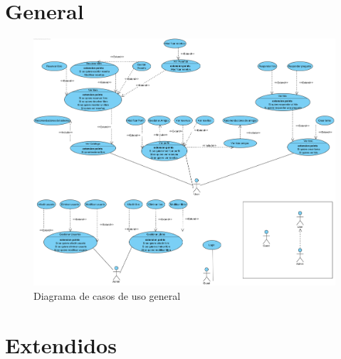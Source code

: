 \documentclass{report}
\begin{document}
        \section{General}
            \begin{figure}[H]
                \centering
                \includegraphics[scale=0.3]{img/casos_uso/General.png}
                \caption{Diagrama de casos de uso general}
            \end{figure}
        \clearpage
        \section{Extendidos}
\end{document}
